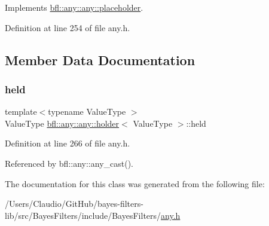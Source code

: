 Implements \mbox{\hyperlink{classbfl_1_1any_1_1any_1_1placeholder_a3bbcdbccbceacccd08befecaade4e510}{bfl\+::any\+::any\+::placeholder}}.



Definition at line 254 of file any.\+h.



\subsection{Member Data Documentation}
\mbox{\label{classbfl_1_1any_1_1any_1_1holder_a07d3496553fcbf7f38c34b1150eeff9d}} 
\subsubsection{\texorpdfstring{held}{held}}
{\footnotesize\ttfamily template$<$typename Value\+Type $>$ \\
Value\+Type \mbox{\hyperlink{classbfl_1_1any_1_1any_1_1holder}{bfl\+::any\+::any\+::holder}}$<$ Value\+Type $>$\+::held}



Definition at line 266 of file any.\+h.



Referenced by bfl\+::any\+::any\+\_\+cast().



The documentation for this class was generated from the following file\+:\begin{DoxyCompactItemize}
\item 
/\+Users/\+Claudio/\+Git\+Hub/bayes-\/filters-\/lib/src/\+Bayes\+Filters/include/\+Bayes\+Filters/\mbox{\hyperlink{any_8h}{any.\+h}}\end{DoxyCompactItemize}
